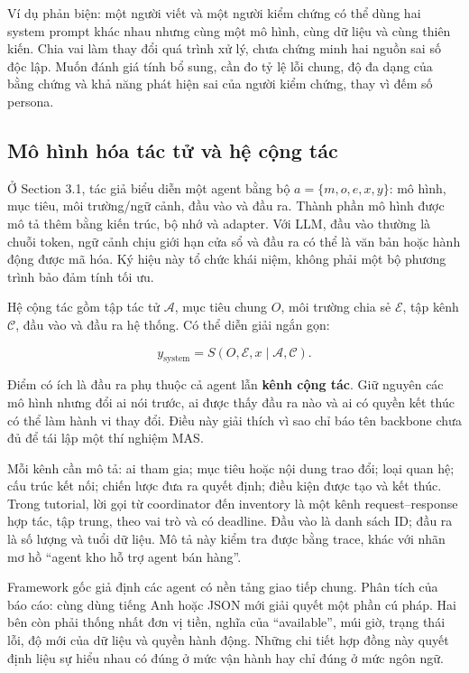 Ví dụ phản biện: một người viết và một người kiểm chứng có thể dùng hai
system prompt khác nhau nhưng cùng một mô hình, cùng dữ liệu và cùng
thiên kiến. Chia vai làm thay đổi quá trình xử lý, chưa chứng minh hai
nguồn sai số độc lập. Muốn đánh giá tính bổ sung, cần đo tỷ lệ lỗi
chung, độ đa dạng của bằng chứng và khả năng phát hiện sai của người
kiểm chứng, thay vì đếm số persona.

\subsection{Mô hình hóa tác tử và hệ cộng
tác}\label{muxf4-huxecnh-huxf3a-tuxe1c-tux1eed-vuxe0-hux1ec7-cux1ed9ng-tuxe1c}

Ở Section 3.1, tác giả biểu diễn một agent bằng bộ \(a=\{m,o,e,x,y\}\):
mô hình, mục tiêu, môi trường/ngữ cảnh, đầu vào và đầu ra. Thành phần mô
hình được mô tả thêm bằng kiến trúc, bộ nhớ và adapter. Với LLM, đầu vào
thường là chuỗi token, ngữ cảnh chịu giới hạn cửa sổ và đầu ra có thể là
văn bản hoặc hành động được mã hóa. Ký hiệu này tổ chức khái niệm, không
phải một bộ phương trình bảo đảm tính tối ưu.

Hệ cộng tác gồm tập tác tử \(\mathcal A\), mục tiêu chung \(O\), môi
trường chia sẻ \(\mathcal E\), tập kênh \(\mathcal C\), đầu vào và đầu
ra hệ thống. Có thể diễn giải ngắn gọn:

\[y_{\mathrm{system}}=S(O,\mathcal E,x\mid \mathcal A,\mathcal C).\]

Điểm có ích là đầu ra phụ thuộc cả agent lẫn \textbf{kênh cộng tác}. Giữ
nguyên các mô hình nhưng đổi ai nói trước, ai được thấy đầu ra nào và ai
có quyền kết thúc có thể làm hành vi thay đổi. Điều này giải thích vì
sao chỉ báo tên backbone chưa đủ để tái lập một thí nghiệm MAS.

Mỗi kênh cần mô tả: ai tham gia; mục tiêu hoặc nội dung trao đổi; loại
quan hệ; cấu trúc kết nối; chiến lược đưa ra quyết định; điều kiện được
tạo và kết thúc. Trong tutorial, lời gọi từ coordinator đến inventory là
một kênh request--response hợp tác, tập trung, theo vai trò và có
deadline. Đầu vào là danh sách ID; đầu ra là số lượng và tuổi dữ liệu.
Mô tả này kiểm tra được bằng trace, khác với nhãn mơ hồ ``agent kho hỗ
trợ agent bán hàng''.

Framework gốc giả định các agent có nền tảng giao tiếp chung. Phân tích
của báo cáo: cùng dùng tiếng Anh hoặc JSON mới giải quyết một phần cú
pháp. Hai bên còn phải thống nhất đơn vị tiền, nghĩa của ``available'',
múi giờ, trạng thái lỗi, độ mới của dữ liệu và quyền hành động. Những
chi tiết hợp đồng này quyết định liệu sự hiểu nhau có đúng ở mức vận
hành hay chỉ đúng ở mức ngôn ngữ.

